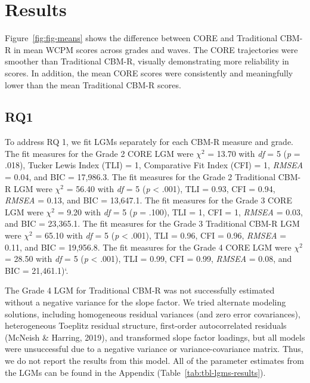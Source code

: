 \documentclass[
  english,
  man, fleqn, noextraspace]{apa6}
\begin{document}
\hypertarget{results}{%
\section{Results}\label{results}}

Figure~\ref{fig:fig-means} shows the difference between CORE and Traditional CBM-R in mean WCPM scores across grades and waves. The CORE trajectories were smoother than Traditional CBM-R, visually demonstrating more reliability in scores. In addition, the mean CORE scores were consistently and meaningfully lower than the mean Traditional CBM-R scores.

\hypertarget{rq1}{%
\subsection{RQ1}\label{rq1}}

To address RQ 1, we fit LGMs separately for each CBM-R measure and grade. The fit measures for the Grade 2 CORE LGM were \(\chi^2\) = 13.70 with \emph{df} = 5 (\emph{p} = .018), Tucker Lewis Index (TLI) = 1, Comparative Fit Index (CFI) = 1, \emph{RMSEA} = 0.04, and BIC = 17,986.3. The fit measures for the Grade 2 Traditional CBM-R LGM were \(\chi^2\) = 56.40 with \emph{df} = 5 (\emph{p} \textless{} .001), TLI = 0.93, CFI = 0.94, \emph{RMSEA} = 0.13, and BIC = 13,647.1. The fit measures for the Grade 3 CORE LGM were \(\chi^2\) = 9.20 with \emph{df} = 5 (\emph{p} = .100), TLI = 1, CFI = 1, \emph{RMSEA} = 0.03, and BIC = 23,365.1. The fit measures for the Grade 3 Traditional CBM-R LGM were \(\chi^2\) = 65.10 with \emph{df} = 5 (\emph{p} \textless{} .001), TLI = 0.96, CFI = 0.96, \emph{RMSEA} = 0.11, and BIC = 19,956.8. The fit measures for the Grade 4 CORE LGM were \(\chi^2\) = 28.50 with \emph{df} = 5 (\emph{p} \textless{} .001), TLI = 0.99, CFI = 0.99, \emph{RMSEA} = 0.08, and BIC = 21,461.1)`.

The Grade 4 LGM for Traditional CBM-R was not successfully estimated without a negative variance for the slope factor. We tried alternate modeling solutions, including homogeneous residual variances (and zero error covariances), heterogeneous Toeplitz residual structure, first-order autocorrelated residuals (McNeish \& Harring, 2019), and transformed slope factor loadings, but all models were unsuccessful due to a negative variance or variance-covariance matrix. Thus, we do not report the results from this model. All of the parameter estimates from the LGMs can be found in the Appendix (Table~\ref{tab:tbl-lgms-results}).
\end{document}
